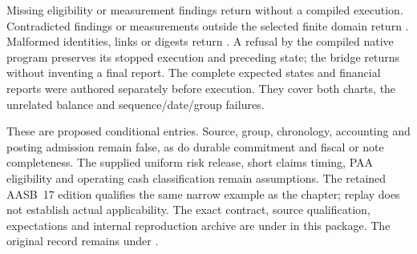 Missing eligibility or measurement findings return  without
a compiled execution. Contradicted findings or measurements outside the selected
finite domain return . Malformed identities, links or digests
return . A refusal by the compiled native program preserves its
stopped execution and preceding state; the bridge returns 
without inventing a final report. The complete expected states and financial
reports were authored separately before execution. They cover both charts,
the unrelated balance and sequence/date/group failures.

These are proposed conditional entries. Source, group, chronology, accounting
and posting admission remain false, as do durable commitment and fiscal or
note completeness. The supplied uniform risk release, short claims timing,
PAA eligibility and operating cash classification remain assumptions. The
retained AASB~17 edition qualifies the same narrow example as the chapter;
replay does not establish actual applicability. The exact contract, source
qualification, expectations and internal reproduction archive are under
 in this package. The original record
remains under .


